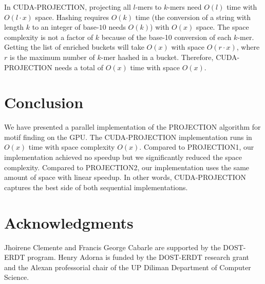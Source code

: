 \documentclass{llncs}
\begin{document}
{In CUDA-PROJECTION, projecting all $l$-mers to $k$-mers need $O(l)$ time with $O(l \cdot x)$ space. Hashing requires $O(k)$ time ({the conversion of a string with length $k$  to an integer of base-$10$ needs $O(k)$}) with $O(x)$ space. The space complexity is {not a factor of $k$ because of the base-10 conversion of each $k$-mer}. Getting the list of enriched buckets will take $O(x)$ with space $O(r \cdot x)$, where $r$ is the maximum number of $k$-mer hashed in a bucket.  Therefore, CUDA-PROJECTION needs a total of $O(x)$ time with space $O(x)$.

\section{Conclusion}
We have presented a parallel implementation of the PROJECTION algorithm for motif finding on the GPU. The CUDA-PROJECTION implementation  runs in $O(x)$ time with space complexity $O(x)$. Compared to PROJECTION1, our implementation achieved no speedup but we significantly reduced the space complexity. Compared to PROJECTION2, our implementation uses the same amount of space with linear speedup. In other words, CUDA-PROJECTION captures the best side of both sequential implementations. 

\section*{Acknowledgments}
Jhoirene Clemente and Francis George Cabarle are supported by the {DOST-ERDT program}. Henry Adorna is funded by the {DOST-ERDT research grant} and the Alexan professorial chair of the {UP Diliman Department of Computer Science}.



}
\end{document}
